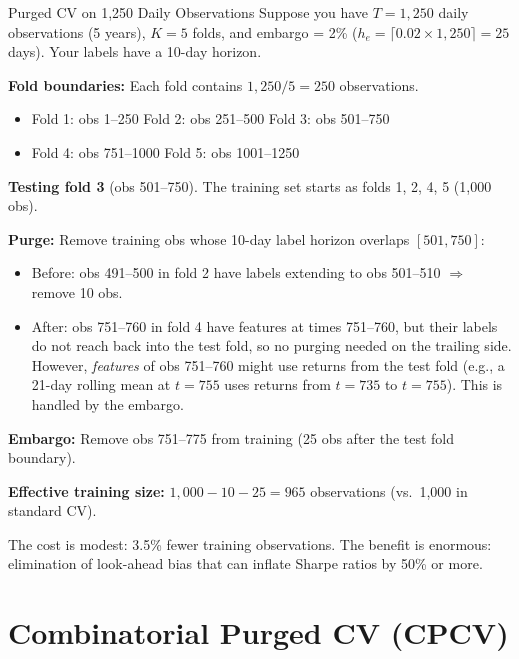 \begin{workedexample}{Purged CV on 1,250 Daily Observations}
Suppose you have $T = 1{,}250$ daily observations (5 years), $K = 5$ folds, and embargo = 2\% ($h_e = \lceil 0.02 \times 1{,}250 \rceil = 25$ days). Your labels have a 10-day horizon.

\textbf{Fold boundaries:} Each fold contains $1{,}250 / 5 = 250$ observations.
\begin{itemize}[nosep]
  \item Fold 1: obs 1--250 \quad Fold 2: obs 251--500 \quad Fold 3: obs 501--750
  \item Fold 4: obs 751--1000 \quad Fold 5: obs 1001--1250
\end{itemize}

\textbf{Testing fold 3} (obs 501--750). The training set starts as folds 1, 2, 4, 5 (1{,}000 obs).

\textbf{Purge:} Remove training obs whose 10-day label horizon overlaps $[501, 750]$:
\begin{itemize}[nosep]
  \item Before: obs 491--500 in fold 2 have labels extending to obs 501--510 $\Rightarrow$ remove 10 obs.
  \item After: obs 751--760 in fold 4 have features at times 751--760, but their labels do not reach back into the test fold, so no purging needed on the trailing side. However, \emph{features} of obs 751--760 might use returns from the test fold (e.g., a 21-day rolling mean at $t = 755$ uses returns from $t = 735$ to $t = 755$). This is handled by the embargo.
\end{itemize}

\textbf{Embargo:} Remove obs 751--775 from training (25 obs after the test fold boundary).

\textbf{Effective training size:} $1{,}000 - 10 - 25 = 965$ observations (vs.\ 1{,}000 in standard CV).

The cost is modest: 3.5\% fewer training observations. The benefit is enormous: elimination of look-ahead bias that can inflate Sharpe ratios by 50\% or more.
\end{workedexample}

\section{Combinatorial Purged CV (CPCV)}
\label{sec:cpcv}

